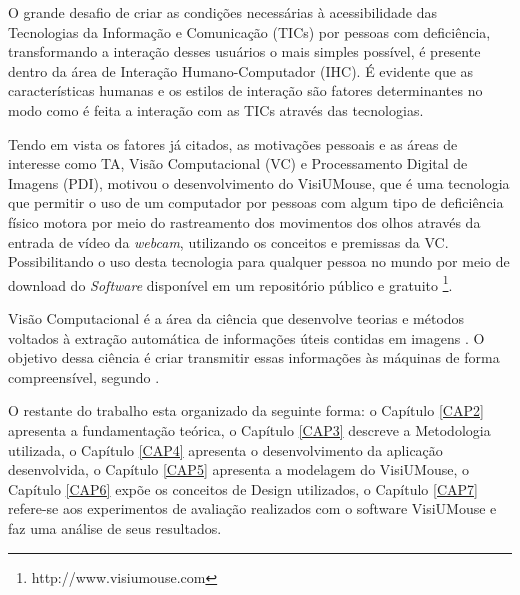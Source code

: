 O grande desafio de criar as condições necessárias à acessibilidade das Tecnologias da Informação e Comunicação (TICs) por pessoas com deficiência, transformando a interação desses usuários o mais simples possível, é presente dentro da área de Interação Humano-Computador (IHC). É evidente que as características humanas e os estilos de interação são fatores determinantes no modo como é feita a interação com as TICs através das tecnologias.

Tendo em vista os fatores já citados, as motivações pessoais e as áreas de interesse como TA, Visão Computacional (VC) e Processamento Digital de Imagens (PDI), motivou o desenvolvimento do VisiUMouse, que é  uma tecnologia que permitir o uso de um computador  por pessoas com algum tipo de deficiência físico motora por meio do rastreamento dos movimentos dos olhos através da entrada de vídeo da \textit{webcam}, utilizando os conceitos e premissas da VC. Possibilitando o uso desta tecnologia para qualquer pessoa no mundo por meio de download do \textit{Software} disponível em um repositório público e gratuito \footnote{http://www.visiumouse.com}.

Visão Computacional  é a área da ciência que desenvolve teorias e métodos voltados à extração automática de informações úteis contidas em imagens \cite{prince2012computer}. O objetivo dessa ciência é criar transmitir essas informações às máquinas de forma compreensível, segundo .


O restante do trabalho esta organizado da seguinte forma: o Capítulo \ref{CAP2} apresenta a fundamentação teórica, o Capítulo \ref{CAP3} descreve a Metodologia utilizada, o Capítulo \ref{CAP4} apresenta o desenvolvimento da aplicação desenvolvida, o Capítulo \ref{CAP5} apresenta a modelagem do VisiUMouse, o Capítulo \ref{CAP6} expõe os conceitos de Design utilizados, o Capítulo \ref{CAP7} refere-se aos experimentos de avaliação realizados com o software VisiUMouse e faz uma análise de seus resultados. 


